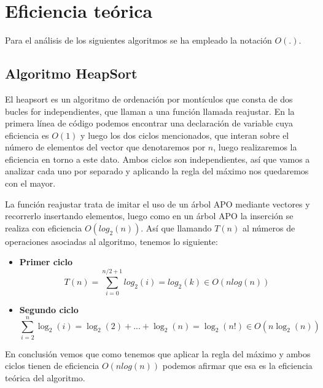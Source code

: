 \documentclass{homework}
\begin{document}
    \section{Eficiencia teórica}

    Para el análisis de los siguientes algoritmos se ha empleado la notación $O(.)$. 

    \subsection{Algoritmo HeapSort}
    
     

    El heapsort es un algoritmo de ordenación por montículos que consta de dos bucles for independientes, que llaman a una función llamada reajustar.
    En la primera línea de código podemos encontrar una declaración de variable cuya eficiencia es $O(1)$ y luego los dos ciclos mencionados, que interan 
    sobre el número de elementos del vector que denotaremos por $n$, luego realizaremos la eficiencia en torno a este dato. Ambos ciclos son independientes, 
    así que vamos a analizar cada uno por separado y aplicando la regla del máximo nos quedaremos con el mayor.
    
    La función reajustar trata de imitar el uso de un árbol APO mediante vectores y recorrerlo insertando elementos, luego como en un árbol APO la inserción se 
    realiza con eficiencia $O(log_2(n))$. Así que llamando $T(n)$ al números de operaciones asociadas al algoritmo, tenemos lo siguiente:
    
    \begin{itemize}
        \item \textbf{Primer ciclo}
        \begin{equation*}
            T(n) = \sum_{i=0}^{n/2 + 1} log_2(i) = log_2(k) \in O(nlog(n))
        \end{equation*} 

        \item \textbf{Segundo ciclo}
            $$\sum_{i=2}^{n} \log_2(i) = \log_2(2) + ... + \log_2(n) = \log_2(n!) \in O(n \log_2(n))$$
        
        
    \end{itemize}

    En conclusión vemos que como tenemos que aplicar la regla del máximo y ambos ciclos tienen de eficiencia $O(nlog(n))$ podemos afirmar que esa es la eficiencia
    teórica del algoritmo. 
\end{document}
